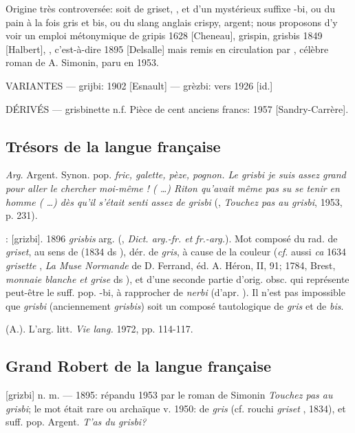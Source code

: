 Origine très controversée: soit de griset, , et d'un mystérieux suffixe -bi, ou du pain à la fois gris et bis, ou du slang anglais crispy, argent; nous proposons d'y voir un emploi métonymique de gripis 1628 [Cheneau], grispin, grisbis 1849 [Halbert], , c'est-à-dire  1895 [Delsalle] mais remis en circulation par , célèbre roman de A. Simonin, paru en 1953.

VARIANTES ---  grijbi: 1902 [Esnault] --- grèzbi: vers 1926 [id.]

DÉRIVÉS --- grisbinette n.f. Pièce de cent anciens francs: 1957
[Sandry-Carrère].


\subsection*{Trésors de la langue française}

\emph{Arg.} Argent. Synon. pop. \emph{fric, galette, pèze, pognon. Le grisbi je suis assez grand pour aller le chercher moi-même ! (  \ldots ) Riton qu'avait même pas su se tenir en homme (  \ldots ) dès qu'il s'était senti assez de grisbi} (, \emph{Touchez pas au grisbi}, 1953, p. 231).

: [grizbi].   1896 \emph{grisbis}
arg.  (, \emph{Dict. arg.-fr. et fr.-arg.}). Mot composé du rad. de \emph{griset}, au sens de  (1834 ds ), dér. de \emph{gris}, à cause de la couleur (\emph{cf.} aussi \emph{ca} 1634 \emph{grisette} , \emph{La Muse Normande} de D. Ferrand, éd. A. Héron, II, 91; 1784, Brest, \emph{monnaie blanche et grise} ds ), et d'une seconde partie d'orig. obsc. qui représente peut-être le suff. pop. -bi, à rapprocher de \emph{nerbi}  (d'apr. ). Il n'est pas impossible que \emph{grisbi} (anciennement \emph{grisbis}) soit un composé tautologique de \emph{gris} et de \emph{bis}.

  (A.). L'arg. litt. \emph{Vie lang.} 1972, pp. 114-117.


\subsection*{Grand Robert de la langue française}

[grizbi] n. m. --- 1895: répandu 1953 par le roman de Simonin \emph{Touchez pas au grisbi}; le mot était rare ou archaïque v. 1950: de \emph{gris}  (cf. rouchi \emph{griset} , 1834), et suff. pop.  Argent. \emph{T'as du grisbi?}

